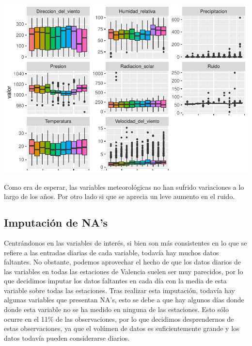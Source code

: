\documentclass[notspecified,article,submit,moreauthors,pdftex]{Definitions/mdpi}
\begin{document}
\includegraphics{ProyectoAED2023_plantilla_files/figure-latex/unnamed-chunk-22-1.pdf}

Como era de esperar, las variables meteorológicas no han sufrido
variaciones a lo largo de los años. Por otro lado si que se aprecia un
leve aumento en el ruido.

\hypertarget{imputaciuxf3n-de-nas}{%
\subsection{Imputación de NA's}\label{imputaciuxf3n-de-nas}}

Centrándonos en las variables de interés, si bien son más consistentes
en lo que se refiere a las entradas diarias de cada variable, todavía
hay muchos datos faltantes. No obstante, podemos aprovechar el hecho de
que los datos diarios de las variables en todas las estaciones de
Valencia suelen ser muy parecidos, por lo que decidimos imputar los
datos faltantes en cada día con la media de esta variable sobre todas
las estaciones. Tras realizar esta imputación, todavía hay algunas
variables que presentan NA's, esto se debe a que hay algunos días donde
donde esta variable no se ha medido en ninguna de las estaciones. Esto
sólo ocurre en el 11\% de las observaciones, por lo que decidimos
desprendernos de estas observaciones, ya que el volúmen de datos es
suficientemente grande y los datos todavía pueden considerarse diarios.
\end{document}
